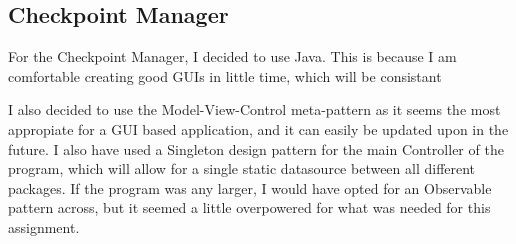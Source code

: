 \documentclass[10pt, a4paper]{article}
\begin{document}
\subsection{Checkpoint Manager}
For the Checkpoint Manager, I decided to use Java. This is because I am comfortable creating good GUIs in little time, which will be consistant

I also decided to use the Model-View-Control meta-pattern as it seems the most appropiate for a GUI based application, and it can easily be updated upon in the future. I also have used a Singleton design pattern for the main Controller of the program, which will allow for a single static datasource between all different packages. If the program was any larger, I would have opted for an Observable pattern across, but it seemed a little overpowered for what was needed for this assignment. 
\end{document}
